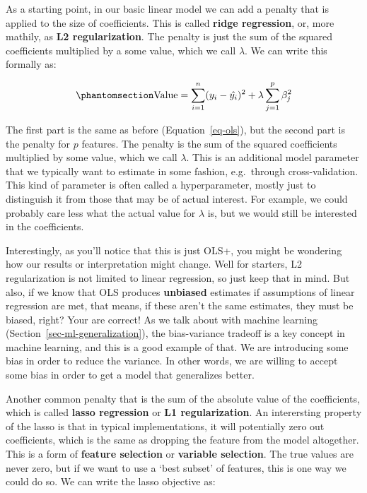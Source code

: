 \documentclass[
  letterpaper,
]{krantz}
\begin{document}
As a starting point, in our basic linear model we can add a penalty that
is applied to the size of coefficients. This is called \textbf{ridge
regression}, or, more mathily, as \textbf{L2 regularization}. The
penalty is just the sum of the squared coefficients multiplied by a some
value, which we call \(\lambda\). We can write this formally as:

\begin{equation}\phantomsection\label{eq-ols-ridge}{
\textrm{Value} = \sum_{i=1}^{n} (y_i - \hat{y_i})^2 + \lambda \sum_{j=1}^{p} \beta_j^2
}\end{equation}

The first part is the same as before (Equation~\ref{eq-ols}), but the
second part is the penalty for \(p\) features. The penalty is the sum of
the squared coefficients multiplied by some value, which we call
\(\lambda\). This is an additional model parameter that we typically
want to estimate in some fashion, e.g.~through cross-validation. This
kind of parameter is often called a hyperparameter, mostly just to
distinguish it from those that may be of actual interest. For example,
we could probably care less what the actual value for \(\lambda\) is,
but we would still be interested in the coefficients.

Interestingly, as you'll notice that this is just OLS+, you might be
wondering how our results or interpretation might change. Well for
starters, L2 regularization is not limited to linear regression, so just
keep that in mind. But also, if we know that OLS produces
\textbf{unbiased} estimates if assumptions of linear regression are met,
that means, if these aren't the same estimates, they must be biased,
right? Your are correct! As we talk about with machine learning
(Section~\ref{sec-ml-generalization}), the bias-variance tradeoff is a
key concept in machine learning, and this is a good example of that. We
are introducing some bias in order to reduce the variance. In other
words, we are willing to accept some bias in order to get a model that
generalizes better.

Another common penalty that is the sum of the absolute value of the
coefficients, which is called \textbf{lasso regression} or \textbf{L1
regularization}. An interersting property of the lasso is that in
typical implementations, it will potentially zero out coefficients,
which is the same as dropping the feature from the model altogether.
This is a form of \textbf{feature selection} or \textbf{variable
selection}. The true values are never zero, but if we want to use a
`best subset' of features, this is one way we could do so. We can write
the lasso objective as:
\end{document}

